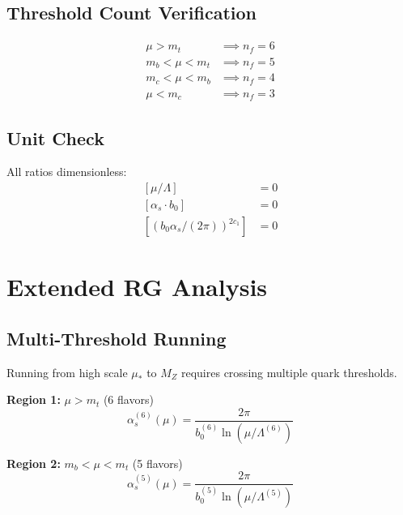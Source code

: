 \documentclass[11pt,a4paper]{article}
\theoremstyle{definition}
\begin{document}
\subsection{Threshold Count Verification}
\label{subsec:app-thresh-verify}

\begin{align}
\label{eq:app-40}
\mu > m_t &\implies n_f = 6 \\
\label{eq:app-41}
m_b < \mu < m_t &\implies n_f = 5 \\
\label{eq:app-42}
m_c < \mu < m_b &\implies n_f = 4 \\
\label{eq:app-43}
\mu < m_c &\implies n_f = 3
\end{align}

\subsection{Unit Check}
\label{subsec:app-unit-check}

All ratios dimensionless:
\begin{align}
\label{eq:app-44}
[\mu/\Lambda] &= 0 \\
\label{eq:app-45}
[\alpha_s \cdot b_0] &= 0 \\
\label{eq:app-46}
[(b_0\alpha_s/(2\pi))^{2c_1}] &= 0
\end{align}

\section{Extended RG Analysis}
\label{app:extended-rg}

\subsection{Multi-Threshold Running}
\label{subsec:app-multi-thresh}

Running from high scale $\mu_*$ to $M_Z$ requires crossing multiple quark thresholds.

\textbf{Region 1:} $\mu > m_t$ (6 flavors)
\begin{equation}
\label{eq:app-47}
\alpha_s^{(6)}(\mu) = \frac{2\pi}{b_0^{(6)}\ln(\mu/\Lambda^{(6)})}
\end{equation}

\textbf{Region 2:} $m_b < \mu < m_t$ (5 flavors)
\begin{equation}
\label{eq:app-48}
\alpha_s^{(5)}(\mu) = \frac{2\pi}{b_0^{(5)}\ln(\mu/\Lambda^{(5)})}
\end{equation}
\end{document}
